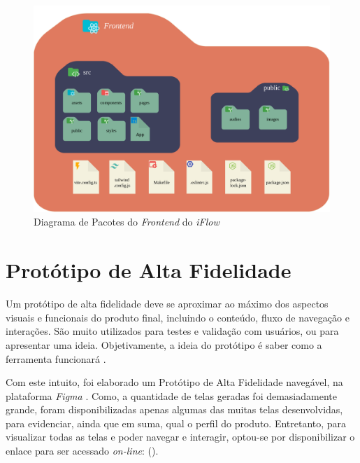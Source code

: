 \begin{figure}[]
    \begin{center}
        \caption{{Diagrama de Pacotes do \textit{Frontend} do \textit{iFlow}}}
        \label{fig:pacotes_frontend}
        \includegraphics[scale=0.7]{figuras/Proposta/Diagrama_de_Pacotes-Frontend.png}
    \end{center}
\end{figure}

\section{Protótipo de Alta Fidelidade}

\label{sec:prototipo_de_alta_fidelidade}

Um protótipo de alta fidelidade deve se aproximar ao máximo dos aspectos visuais e funcionais do produto final, incluindo o conteúdo, fluxo de navegação e interações. São muito utilizados para testes e validação com usuários, ou para apresentar uma ideia. Objetivamente, a ideia do protótipo é saber como a ferramenta funcionará \cite{hf_prototype}.

Com este intuito, foi elaborado um Protótipo de Alta Fidelidade navegável, na plataforma \textit{Figma} \cite{figma}. Como, a quantidade de telas geradas foi demasiadamente grande, foram disponibilizadas apenas algumas das muitas telas desenvolvidas, para evidenciar, ainda que em suma, qual o perfil do produto. Entretanto, para visualizar todas as telas e poder navegar e interagir, optou-se por disponibilizar o enlace para ser acessado \textit{on-line}:  (\citeyear{prototipo_alta_fidelidade}).

